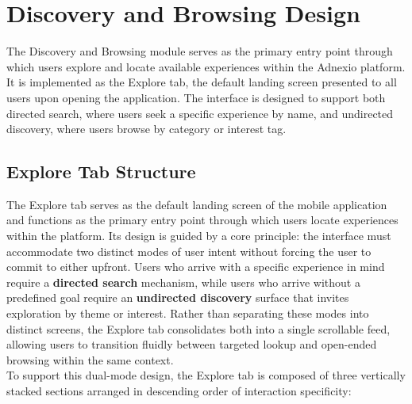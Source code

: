 \section{Discovery and Browsing Design}
The Discovery and Browsing module serves as the primary entry point through which users explore and locate available experiences within the Adnexio platform. It is implemented as the Explore tab, the default landing screen presented to all users upon opening the application. The interface is designed to support both directed search, where users seek a specific experience by name, and undirected discovery, where users browse by category or interest tag.

\subsection{Explore Tab Structure}
The Explore tab serves as the default landing screen of the mobile application and functions as the primary entry point through which users locate experiences within the platform. Its design is guided by a core principle: the interface must accommodate two distinct modes of user intent without forcing the user to commit to either upfront. Users who arrive with a specific experience in mind require a \textbf{directed search } mechanism, while users who arrive without a predefined goal require an \textbf{undirected discovery} surface that invites exploration by theme or interest. Rather than separating these modes into distinct screens, the Explore tab consolidates both into a single scrollable feed, allowing users to transition fluidly between targeted lookup and open-ended browsing within the same context.
\\
To support this dual-mode design, the Explore tab is composed of three vertically stacked sections arranged in descending order of interaction specificity:
